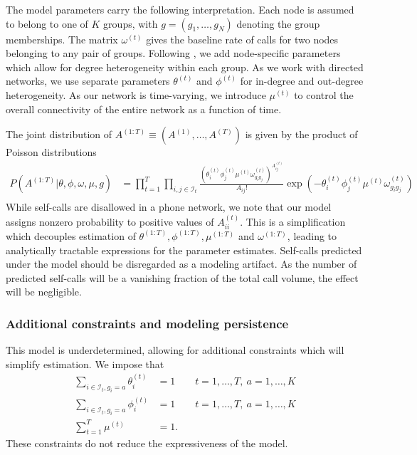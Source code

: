 \documentclass{article}
\begin{document}
The model parameters carry the following interpretation. Each node is assumed to belong to one of $K$ groups, with $g=(g_1,\ldots,g_N)$ denoting the group memberships. The matrix $\omega^{(t)}$ gives the baseline rate of calls for two nodes belonging to any pair of groups. Following \cite{karrer2011stochastic}, we add node-specific parameters which allow for degree heterogeneity within each group. As we work with directed networks, we use separate parameters $\theta^{(t)}$ and $\phi^{(t)}$ for in-degree and out-degree heterogeneity. As our network is time-varying, we introduce $\mu^{(t)}$ to control the overall connectivity of the entire network as a function of time. 

The joint distribution of $A^{(1:T)} \equiv (A^{(1)},\ldots,A^{(T)})$ is given by the product of Poisson distributions
\begin{align*}
P(A^{(1:T)}|\theta,\phi,\omega,\mu,g) & = \prod_{t=1}^T \prod_{i, j \in \mathcal{I}_t} \frac{\left(\theta_i^{(t)} \phi_j^{(t)} \mu^{(t)} \omega_{g_i g_j}^{(t)}\right)^{A_{ij}^{(t)}}}{A_{ij}!} \exp\left(- \theta_i^{(t)} \phi_j^{(t)} \mu^{(t)} \omega_{g_i g_j}^{(t)}\right) \\
\end{align*}
While self-calls are disallowed in a phone network, we note that our model assigns nonzero probability to positive values of $A_{ii}^{(t)}$. This is a simplification which decouples estimation of $\theta^{(1:T)}, \phi^{(1:T)}, \mu^{(1:T)}$ and $\omega^{(1:T)}$, leading to analytically tractable expressions for the parameter estimates. Self-calls predicted under the model should be disregarded as a modeling artifact. As the number of predicted self-calls will be a vanishing fraction of the total call volume, the effect will be negligible.


\subsubsection{Additional constraints and modeling persistence}

This model is underdetermined, allowing for additional constraints which will simplify estimation. We impose that
\begin{align*}
\sum_{i \in \mathcal{I}_t, g_i=a} \theta_i^{(t)} & = 1 \qquad t=1,\ldots,T,\ a=1,\ldots,K\\
\sum_{i \in \mathcal{I}_t, g_i=a} \phi_i^{(t)} & = 1 \qquad t=1,\ldots,T,\ a=1,\ldots,K\\
\sum_{t=1}^T \mu^{(t)} & = 1.
\end{align*}
These constraints do not reduce the expressiveness of the model.
\end{document}
